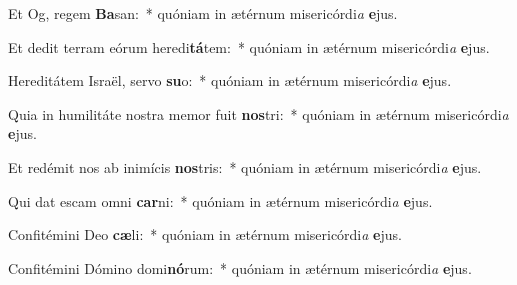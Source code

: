 \item Et Og, regem \textbf{Ba}san:~* quóniam in ætérnum misericórdi\textit{a} \textbf{e}jus.
\item Et dedit terram eórum heredi\textbf{tá}tem:~* quóniam in ætérnum misericórdi\textit{a} \textbf{e}jus.
\item Hereditátem Israël, servo \textbf{su}o:~* quóniam in ætérnum misericórdi\textit{a} \textbf{e}jus.
\item Quia in humilitáte nostra memor fuit \textbf{nos}tri:~* quóniam in ætérnum misericórdi\textit{a} \textbf{e}jus.
\item Et redémit nos ab inimícis \textbf{nos}tris:~* quóniam in ætérnum misericórdi\textit{a} \textbf{e}jus.
\item Qui dat escam omni \textbf{car}ni:~* quóniam in ætérnum misericórdi\textit{a} \textbf{e}jus.
\item Confitémini Deo \textbf{cæ}li:~* quóniam in ætérnum misericórdi\textit{a} \textbf{e}jus.
\item Confitémini Dómino domi\textbf{nó}rum:~* quóniam in ætérnum misericórdi\textit{a} \textbf{e}jus.
